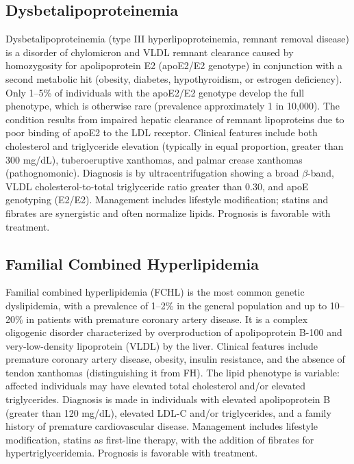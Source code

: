 \subsection{Dysbetalipoproteinemia}
\label{sec:Dysbetalipoproteinemia}
Dysbetalipoproteinemia (type III hyperlipoproteinemia, remnant removal disease) is a disorder of chylomicron and VLDL remnant clearance caused by homozygosity for apolipoprotein E2 (apoE2/E2 genotype) in conjunction with a second metabolic hit (obesity, diabetes, hypothyroidism, or estrogen deficiency). Only 1--5\% of individuals with the apoE2/E2 genotype develop the full phenotype, which is otherwise rare (prevalence approximately 1 in 10,000). The condition results from impaired hepatic clearance of remnant lipoproteins due to poor binding of apoE2 to the LDL receptor. Clinical features include both cholesterol and triglyceride elevation (typically in equal proportion, greater than 300 mg/dL), tuberoeruptive xanthomas, and palmar crease xanthomas (pathognomonic). Diagnosis is by ultracentrifugation showing a broad $\beta$-band, VLDL cholesterol-to-total triglyceride ratio greater than 0.30, and apoE genotyping (E2/E2). Management includes lifestyle modification; statins and fibrates are synergistic and often normalize lipids. Prognosis is favorable with treatment.

\subsection{Familial Combined Hyperlipidemia}
\label{sec:Familial Combined Hyperlipidemia}
Familial combined hyperlipidemia (FCHL) is the most common genetic dyslipidemia, with a prevalence of 1--2\% in the general population and up to 10--20\% in patients with premature coronary artery disease. It is a complex oligogenic disorder characterized by overproduction of apolipoprotein B-100 and very-low-density lipoprotein (VLDL) by the liver. Clinical features include premature coronary artery disease, obesity, insulin resistance, and the absence of tendon xanthomas (distinguishing it from FH). The lipid phenotype is variable: affected individuals may have elevated total cholesterol and/or elevated triglycerides. Diagnosis is made in individuals with elevated apolipoprotein B (greater than 120 mg/dL), elevated LDL-C and/or triglycerides, and a family history of premature cardiovascular disease. Management includes lifestyle modification, statins as first-line therapy, with the addition of fibrates for hypertriglyceridemia. Prognosis is favorable with treatment.

